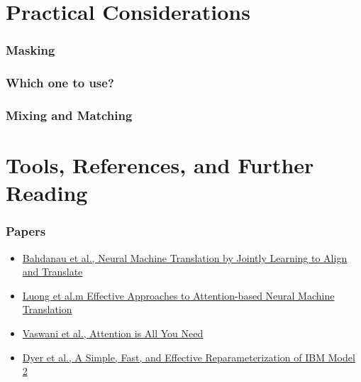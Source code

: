 \documentclass{beamer}
\begin{document}
\section{Practical Considerations}

\begin{frame}
\frametitle{Masking}

\end{frame}

\begin{frame}
\frametitle{Which one to use?}

\end{frame}

\begin{frame}
\frametitle{Mixing and Matching}

\end{frame}


\section{Tools, References, and Further Reading}


\begin{frame}
\frametitle{Papers}
  \begin{itemize}
    \item \href{https://arxiv.org/pdf/1409.0473}{Bahdanau et al., Neural Machine Translation by Jointly Learning to Align and Translate}
    \item \href{https://arxiv.org/pdf/1508.04025}{Luong et al.m Effective Approaches to Attention-based Neural Machine Translation}
    \item \href{https://papers.nips.cc/paper/7181-attention-is-all-you-need.pdf}{Vaswani et al., Attention is All You Need}
    \item \href{http://www.aclweb.org/anthology/N13-1073}{Dyer et al., A Simple, Fast, and Effective Reparameterization of IBM Model 2}
  \end{itemize}
\end{frame}


\end{document}
